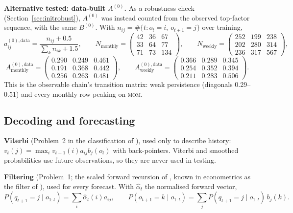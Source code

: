 \documentclass[11pt]{article}
\newcommand{\MOM}{\textsc{mom}}
\begin{document}
\textbf{Alternative tested: data-built $A^{(0)}$.} As a robustness check (Section~\ref{sec:initrobust}), $A^{(0)}$ was instead counted from the observed top-factor sequence, with the same $B^{(0)}$. With $n_{ij}=\#\{t: o_t=i,\ o_{t+1}=j\}$ over training,
\[
a^{(0),\text{data}}_{ij}=\frac{n_{ij}+0.5}{\sum_k n_{ik}+1.5},
\qquad
N_{\text{monthly}}=
\begin{pmatrix}
42 & 36 & 67\\
33 & 64 & 77\\
71 & 73 & 134
\end{pmatrix},
\qquad
N_{\text{weekly}}=
\begin{pmatrix}
252 & 199 & 238\\
202 & 280 & 314\\
236 & 317 & 567
\end{pmatrix},
\]
\[
A^{(0),\text{data}}_{\text{monthly}}=
\begin{pmatrix}
0.290 & 0.249 & 0.461\\
0.191 & 0.368 & 0.442\\
0.256 & 0.263 & 0.481
\end{pmatrix},
\qquad
A^{(0),\text{data}}_{\text{weekly}}=
\begin{pmatrix}
0.366 & 0.289 & 0.345\\
0.254 & 0.352 & 0.394\\
0.211 & 0.283 & 0.506
\end{pmatrix}.
\]
This is the observable chain's transition matrix: weak persistence (diagonals 0.29--0.51) and every monthly row peaking on \MOM.

\subsection{Decoding and forecasting}
\textbf{Viterbi} \citep{viterbi1967} (Problem~2 in the classification of \citealp{rabiner1989}), used only to describe history: $v_t(j)=\max_i v_{t-1}(i)a_{ij}b_j(o_t)$ with back-pointers. Viterbi and smoothed probabilities use future observations, so they are never used in testing.

\textbf{Filtering} (Problem~1; the scaled forward recursion of \citealp{rabiner1989}, known in econometrics as the filter of \citealp{hamilton1989}), used for every forecast. With $\hat\alpha_t$ the normalised forward vector,
\[
P(q_{t+1}=j\mid o_{1:t})=\sum_i\hat\alpha_t(i)a_{ij},\qquad
P(o_{t+1}=k\mid o_{1:t})=\sum_j P(q_{t+1}=j\mid o_{1:t})\,b_j(k).
\]
\end{document}
